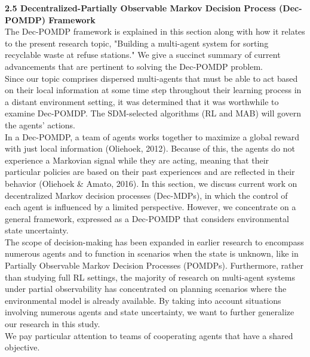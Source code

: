 \documentclass[a4paper,11pt,onecolumn]{article}
\begin{document}
\textbf{2.5 Decentralized-Partially Observable Markov Decision Process (Dec-POMDP) Framework}\\
The Dec-POMDP framework is explained in this section along with how it relates to the present research topic, "Building a multi-agent system for sorting recyclable waste at refuse stations." We give a succinct summary of current advancements that are pertinent to solving the Dec-POMDP problem.\\
Since our topic comprises dispersed multi-agents that must be able to act based on their local information at some time step throughout their learning process in a distant environment setting, it was determined that it was worthwhile to examine Dec-POMDP. The SDM-selected algorithms (RL and MAB) will govern the agents' actions.\\
In a Dec-POMDP, a team of agents works together to maximize a global reward with just local information (Oliehoek, 2012). Because of this, the agents do not experience a Markovian signal while they are acting, meaning that their particular policies are based on their past experiences and are reflected in their behavior (Oliehoek & Amato, 2016). In this section, we discuss current work on decentralized Markov decision processes (Dec-MDPs), in which the control of each agent is influenced by a limited perspective. However, we concentrate on a general framework, expressed as a Dec-POMDP that considers environmental state uncertainty.\\
The scope of decision-making has been expanded in earlier research to encompass numerous agents and to function in scenarios when the state is unknown, like in Partially Observable Markov Decision Processes (POMDPs). Furthermore, rather than studying full RL settings, the majority of research on multi-agent systems under partial observability has concentrated on planning scenarios where the environmental model is already available. By taking into account situations involving numerous agents and state uncertainty, we want to further generalize our research in this study.\\
We pay particular attention to teams of cooperating agents that have a shared objective. 
\end{document}
